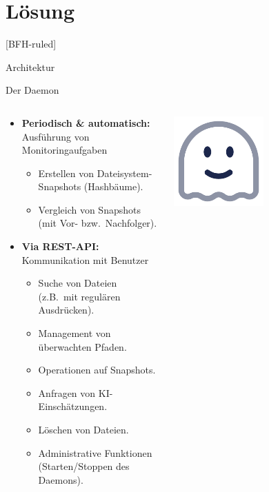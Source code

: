 \documentclass[
    ngerman,%
    authorontitle=true,
]{bfhbeamer}
\begin{document}
    \section{Lösung}\label{sec:loesung}
    [BFH-ruled]
    \frame{\sectionpage}

    \begin{frame}{Architektur}
    \end{frame}

    \begin{frame}{Der Daemon}
        \begin{columns}
            \begin{column}{0.7\textwidth}
                \begin{itemize}
                    \item \textbf{Periodisch \& automatisch:} Ausführung von Monitoringaufgaben
                    \begin{itemize}
                        \item Erstellen von Dateisystem-Snapshots (Hashbäume).
                        \item Vergleich von Snapshots (mit Vor- bzw.\ Nachfolger).
                    \end{itemize}
                    \item \textbf{Via REST-API:} Kommunikation mit Benutzer
                    \begin{itemize}
                        \item Suche von Dateien (z.B.\ mit regulären Ausdrücken).
                        \item Management von überwachten Pfaden.
                        \item Operationen auf Snapshots.
                        \item Anfragen von KI-Einschätzungen.
                        \item Löschen von Dateien.
                        \item Administrative Funktionen (Starten/Stoppen des Daemons).
                    \end{itemize}
                \end{itemize}
            \end{column}
            \begin{column}{0.3\textwidth}
                \begin{center}
                    \includegraphics[width=0.5\textwidth]{assets/presentation/ghost-smile}

\end{center}
\end{column}
\end{columns}
\end{frame}
\end{document}
